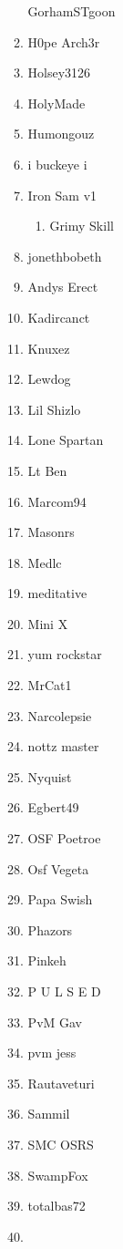 \documentclass{article}
\begin{document}
\begin{enumerate}[I]
\begin{enumerate}[I]
	GorhamSTgoon
      \item
	H0pe Arch3r
      \item
	Holsey3126
      \item
	HolyMade
      \item
	Humongouz
      \item
	i buckeye i
      \item
	Iron Sam v1
	  \begin{enumerate}[I]
	    \item
	      Grimy Skill
	  \end{enumerate}
      \item
	jonethbobeth
      \item
	Andys Erect
      \item
	Kadircanct
      \item
	Knuxez
      \item
	Lewdog
      \item
	Lil Shizlo
      \item
	Lone Spartan
      \item
	Lt Ben
      \item
	Marcom94
      \item
	Masonrs
      \item
	Medlc
      \item
	meditative
      \item
	Mini X
      \item
	yum rockstar
      \item
	MrCat1
      \item
	Narcolepsie
      \item
	nottz master
      \item
	Nyquist
      \item
	Egbert49
      \item
	OSF Poetroe
      \item
	Osf Vegeta
      \item
	Papa Swish
      \item
	Phazors
      \item
	Pinkeh
      \item
	P U L S E D
      \item
	PvM Gav
      \item
	pvm jess
      \item
	Rautaveturi
      \item
	Sammil
      \item
	SMC OSRS
      \item
	SwampFox
      \item
	totalbas72
      \item

\end{enumerate}
\end{enumerate}
\end{document}
